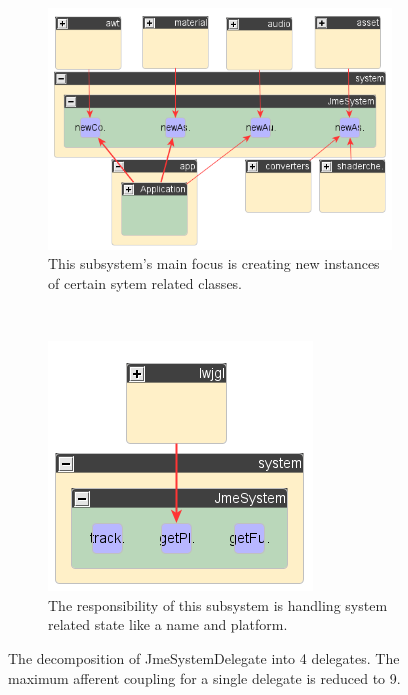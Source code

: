 \documentclass[a4paper, 10pt]{article}
\begin{document}
\begin{figure}
\begin{subfigure}[b]{0.6\textwidth}
\includegraphics[width=\textwidth]{figures/jme-system-factory-part.png}
\caption{This subsystem's main focus is creating new instances of certain sytem related classes.}
\label{fig:system-factory-incoming}
\end{subfigure}
~
\begin{subfigure}[b]{0.4\textwidth}
\includegraphics[width=\textwidth]{figures/jme-system-general-part.png}
\caption{The responsibility of this subsystem is handling system related state like a name and platform.}
\label{fig:system-state-incoming}
\end{subfigure}

\caption{The decomposition of JmeSystemDelegate into 4 delegates. The maximum afferent coupling for a single delegate is reduced to 9.}
\label{fig:system-decomposition}
\end{figure}
\end{document}
